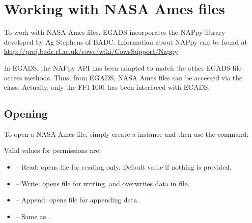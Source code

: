 \documentclass[a4paper,10pt,openany,english]{sphinxmanual}
\begin{document}
\section{Working with NASA Ames files}
\label{tutorial:working-with-nasa-ames-files}
To work with NASA Ames files, EGADS incorporates the NAPpy library developed by Ag Stephens of BADC. Information about NAPpy can be found at \url{http://proj.badc.rl.ac.uk/cows/wiki/CowsSupport/Nappy}

In EGADS, the NAPpy API has been adapted to match the other EGADS file access methods. Thus, from EGADS, NASA Ames files can be accessed via the {\hyperref[egadsapi:egads.input.nasa_ames_io.NasaAmes]{}} class. Actually, only the FFI 1001 has been interfaced with EGADS.


\subsection{Opening}
\label{tutorial:id13}
To open a NASA Ames file, simply create a {\hyperref[egadsapi:egads.input.nasa_ames_io.NasaAmes]{}} instance and then use the  command:

\begin{sphinxVerbatim}[commandchars=\\\{\}]
 
  
\end{sphinxVerbatim}

Valid values for permissions are:
\begin{itemize}
\item {} 
 -- Read: opens file for reading only. Default value if nothing is provided.

\item {} 
 -- Write: opens file for writing, and overwrites data in file.

\item {} 
 -- Append: opens file for appending data.

\item {} 
 -- Same as .

\end{itemize}
\end{document}
